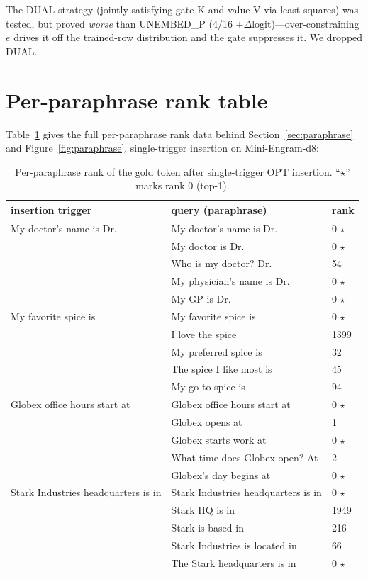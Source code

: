 \documentclass[11pt]{article}
\begin{document}
The DUAL strategy (jointly satisfying gate-K and value-V via
least squares) was tested, but proved \emph{worse} than
UNEMBED\_P (4/16 $+\Delta$logit)---over-constraining $e$ drives
it off the trained-row distribution and the gate suppresses it.
We dropped DUAL.

\section{Per-paraphrase rank table}
\label{app:paraphrase-detail}

Table~\ref{tab:paraphrase} gives the full per-paraphrase rank data
behind Section~\ref{sec:paraphrase}
and Figure~\ref{fig:paraphrase}, single-trigger insertion on
Mini-Engram-d8:

\begin{table}[t]
  \centering
  \caption{Per-paraphrase rank of the gold token after single-trigger
  OPT insertion. ``$\star$'' marks rank 0 (top-1).}
  \label{tab:paraphrase}
  \footnotesize
  \begin{tabular}{lll}
    \toprule
    insertion trigger & query (paraphrase) & rank \\
    \midrule
    My doctor's name is Dr. & My doctor's name is Dr. & 0 $\star$ \\
    & My doctor is Dr. & 0 $\star$ \\
    & Who is my doctor? Dr. & 54 \\
    & My physician's name is Dr. & 0 $\star$ \\
    & My GP is Dr. & 0 $\star$ \\
    \midrule
    My favorite spice is & My favorite spice is & 0 $\star$ \\
    & I love the spice & 1399 \\
    & My preferred spice is & 32 \\
    & The spice I like most is & 45 \\
    & My go-to spice is & 94 \\
    \midrule
    Globex office hours start at & Globex office hours start at & 0 $\star$ \\
    & Globex opens at & 1 \\
    & Globex starts work at & 0 $\star$ \\
    & What time does Globex open? At & 2 \\
    & Globex's day begins at & 0 $\star$ \\
    \midrule
    Stark Industries headquarters is in & Stark Industries headquarters is in & 0 $\star$ \\
    & Stark HQ is in & 1949 \\
    & Stark is based in & 216 \\
    & Stark Industries is located in & 66 \\
    & The Stark headquarters is in & 0 $\star$ \\
    \bottomrule
  \end{tabular}
\end{table}
\end{document}
